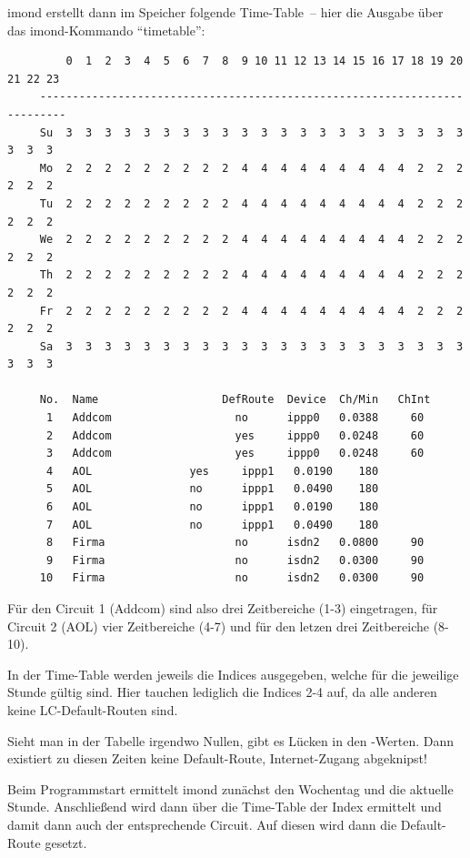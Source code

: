   imond erstellt dann im Speicher folgende Time-Table~-- hier die Ausgabe
  über das imond-Kommando ``timetable'':

\begin{example}
\begin{verbatim}
         0  1  2  3  4  5  6  7  8  9 10 11 12 13 14 15 16 17 18 19 20 21 22 23
     --------------------------------------------------------------------------
     Su  3  3  3  3  3  3  3  3  3  3  3  3  3  3  3  3  3  3  3  3  3  3  3  3
     Mo  2  2  2  2  2  2  2  2  2  4  4  4  4  4  4  4  4  4  2  2  2  2  2  2
     Tu  2  2  2  2  2  2  2  2  2  4  4  4  4  4  4  4  4  4  2  2  2  2  2  2
     We  2  2  2  2  2  2  2  2  2  4  4  4  4  4  4  4  4  4  2  2  2  2  2  2
     Th  2  2  2  2  2  2  2  2  2  4  4  4  4  4  4  4  4  4  2  2  2  2  2  2
     Fr  2  2  2  2  2  2  2  2  2  4  4  4  4  4  4  4  4  4  2  2  2  2  2  2
     Sa  3  3  3  3  3  3  3  3  3  3  3  3  3  3  3  3  3  3  3  3  3  3  3  3

     No.  Name                   DefRoute  Device  Ch/Min   ChInt
      1   Addcom                   no      ippp0   0.0388     60
      2   Addcom                   yes     ippp0   0.0248     60
      3   Addcom                   yes     ippp0   0.0248     60
      4   AOL               yes     ippp1   0.0190    180
      5   AOL               no      ippp1   0.0490    180
      6   AOL               no      ippp1   0.0190    180
      7   AOL               no      ippp1   0.0490    180
      8   Firma                    no      isdn2   0.0800     90
      9   Firma                    no      isdn2   0.0300     90
     10   Firma                    no      isdn2   0.0300     90
\end{verbatim}
\end{example}

  Für den Circuit 1 (Addcom) sind also drei Zeitbereiche (1-3)
  eingetragen, für Circuit 2 (AOL) vier Zeitbereiche (4-7) und
  für den letzen drei Zeitbereiche (8-10).

  In der Time-Table werden jeweils die Indices ausgegeben, welche für
  die jeweilige Stunde gültig sind. Hier tauchen lediglich die Indices
  2-4 auf, da alle anderen keine LC-Default-Routen sind.

  Sieht man in der Tabelle irgendwo Nullen, gibt es Lücken in den
  -Werten. Dann existiert zu diesen Zeiten keine
  Default-Route, Internet-Zugang abgeknipst!

  Beim Programmstart ermittelt imond zunächst den Wochentag und die
  aktuelle Stunde. Anschließend wird dann über die Time-Table der
  Index ermittelt und damit dann auch der entsprechende Circuit. Auf
  diesen wird dann die Default-Route gesetzt.

